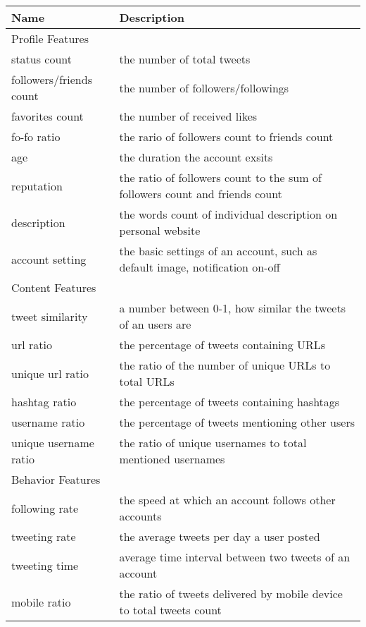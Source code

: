 \documentclass[a4paper, 12pt]{report}
\begin{document}
\begin{table}[h!]
	 \label{tab:title} 
	\begin{center}
		\begin{tabular}{p{4.5cm} | p{11cm}}
			\hline
			Name & Description \\
			\hline
			\multicolumn{2}{|l|}{Profile Features} \\
			\hline
			status count & the number of total tweets \\
			followers/friends count& the number of followers/followings \\
			favorites count & the number of received likes \\
			fo-fo ratio & the rario of followers count to friends count \\
			age & the duration the account exsits \\
			reputation & the ratio of followers count to the sum of followers count and friends count\\
			description & the words count of individual description on personal website \\
			account setting & the basic settings of an account, such as default image, notification on-off  \\
			\hline
			\multicolumn{2}{|l|}{Content Features} \\
			\hline
			tweet similarity & a number between 0-1, how similar the tweets of an users are \\
			url ratio & the percentage of tweets containing URLs  \\
			unique url ratio & the ratio of the number of unique URLs to total URLs\\
			hashtag ratio & the percentage of tweets containing hashtags \\
			username ratio & the percentage of tweets mentioning other users\\
			unique username ratio & the ratio of unique usernames to total mentioned usernames \\
			\hline
			\multicolumn{2}{|l|}{Behavior Features} \\
			\hline
			following rate & the speed at which an account follows other accounts \\
			tweeting rate & the average tweets per day a user posted \\
			tweeting time & average time interval between two tweets of an account \\
			mobile ratio & the ratio of tweets delivered by mobile device to total tweets count \\

\end{tabular}
\end{center}
\end{table}
\end{document}
